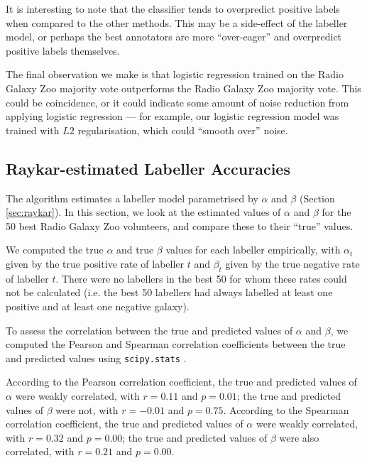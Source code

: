     It is interesting to note that the \citeauthor{raykar10} classifier tends to
    overpredict positive labels when compared to the other methods. This may be
    a side-effect of the labeller model, or perhaps the best annotators are more
    ``over-eager'' and overpredict positive labels themselves.

    The final observation we make is that logistic regression trained on the
    Radio Galaxy Zoo majority vote outperforms the Radio Galaxy Zoo majority
    vote. This could be coincidence, or it could indicate some amount of noise
    reduction from applying logistic regression --- for example, our logistic
    regression model was trained with $L2$ regularisation, which could ``smooth
    over'' noise.

  \subsection{Raykar-estimated Labeller Accuracies}
  \label{sec:raykar-estimates-rgz}

    The \citeauthor{raykar10} algorithm estimates a labeller model parametrised
    by $\alpha$ and $\beta$ (Section \ref{sec:raykar}). In this section, we look
    at the estimated values of $\alpha$ and $\beta$ for the 50 best Radio Galaxy
    Zoo volunteers, and compare these to their ``true'' values.

    We computed the true $\alpha$ and true $\beta$ values for each labeller
    empirically, with $\alpha_t$ given by the true positive rate of labeller $t$
    and $\beta_t$ given by the true negative rate of labeller $t$. There were no
    labellers in the best 50 for whom these rates could not be calculated (i.e.
    the best 50 labellers had always labelled at least one positive and at least
    one negative galaxy).

    To assess the correlation between the true and predicted values of $\alpha$
    and $\beta$, we computed the Pearson and Spearman correlation coefficients
    between the true and predicted values using \texttt{scipy.stats}
    \citep{scipy}.

    According to the Pearson correlation coefficient, the true and predicted
    values of $\alpha$ were weakly correlated, with $r = 0.11$ and $p = 0.01$;
    the true and predicted values of $\beta$ were not, with $r = -0.01$ and $p =
    0.75$. According to the Spearman correlation coefficient, the true and
    predicted values of $\alpha$ were weakly correlated, with $r = 0.32$ and $p
    = 0.00$; the true and predicted values of $\beta$ were also correlated, with
    $r = 0.21$ and $p = 0.00$.

